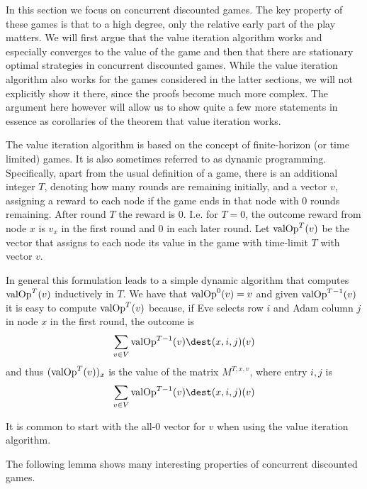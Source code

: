 In this section we focus on concurrent discounted games. 
The key property of these games is that to a high degree, only the relative early part of the play matters.
We will first argue that the value iteration algorithm works and especially converges to the value of the game and then that there are stationary optimal strategies in concurrent discounted games.
While the value iteration algorithm also works for the games considered in the latter sections, we will not explicitly show it there, since the proofs become much more complex. The argument here however will allow us to show quite a few more statements in essence as corollaries of the theorem that value iteration works.


The value iteration algorithm is based on the concept of finite-horizon (or time limited) games. It is also sometimes referred to as dynamic programming.
Specifically, apart from the usual definition of a game, there is an additional integer $T$, denoting how many rounds are remaining initially, and a vector $v$, assigning a reward to each node if the game ends in that node with 0 rounds remaining. After round $T$ the reward is 0. 
I.e. for $T=0$, the outcome reward from node $x$ is $v_x$ in the first round and 0 in each later round.
Let $\text{valOp}^T(v)$ be the vector that assigns to each node its value in the game with time-limit $T$ with vector $v$.

In general this formulation leads to a simple dynamic algorithm that computes $\text{valOp}^T(v)$ inductively in $T$. 
We have that $\text{valOp}^0(v)=v$ and given $\text{valOp}^{T-1}(v)$ it is easy to compute $\text{valOp}^T(v)$ because, if Eve selects row $i$ and Adam column $j$ in node $x$ in the first round, the outcome is \[
\sum_{v\in V}\ValueOp^{T-1}(v)\dest(x,i,j)(v)
\]
and thus $(\text{valOp}^T(v))_x$ is the value of the matrix $M^{T,x,v}$, where entry $i,j$ is \[
\sum_{v\in V}\ValueOp^{T-1}(v)\dest(x,i,j)(v)
\]

It is common to start with the all-0 vector for $v$ when using the value iteration algorithm.

The following lemma shows many interesting properties of concurrent discounted games.






